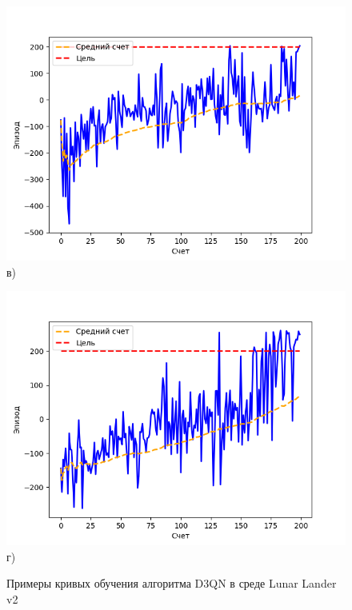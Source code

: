 \begin{figure}[ht]
\begin{minipage}[b][][b]{0.49\linewidth}
		\includegraphics[width=\linewidth]{figures/d3qn_train_score3} \\ в)
	\end{minipage}
	\hfill
	\begin{minipage}[b][][b]{0.49\linewidth}\centering
		\includegraphics[width=\linewidth]{figures/d3qn_train_score4} \\ г)
	\end{minipage}
	\caption{Примеры кривых обучения алгоритма D3QN в среде Lunar Lander v2}
	\label{fig:trainScore}
\end{figure}

\endgroup

